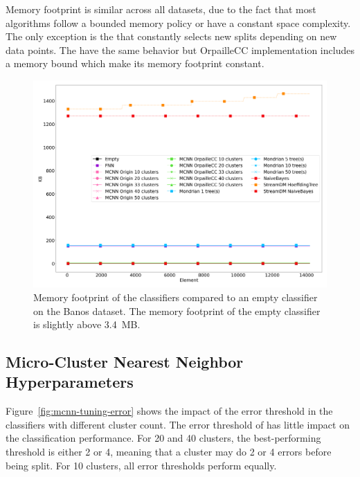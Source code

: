 Memory footprint is similar across all datasets, due to the fact that most
algorithms follow a bounded memory policy or have a constant space complexity.
The only exception is the \hoeffdingtree that constantly selects new splits
depending on new data points. The \mondrianforest have the same behavior but
OrpailleCC implementation includes a memory bound which make its memory
footprint constant.

\begin{figure}
	\includegraphics[width=\linewidth]{figures/results/banos_3_memory.png}
	\caption{Memory footprint of the classifiers compared to an empty
	classifier on the Banos dataset. The memory footprint of the empty
	classifier is slightly above 3.4~MB.}
	\label{fig:memory}
\end{figure}


\subsection{Micro-Cluster Nearest Neighbor Hyperparameters}

Figure~\ref{fig:mcnn-tuning-error} shows the impact of the error threshold
in the \mcnn classifiers with different cluster count. The error
threshold of \mcnn has little impact on the classification performance. For
20 and 40 clusters, the best-performing threshold is either 2 or 4, meaning
that a cluster may do 2 or 4 errors before being split. For 10 clusters,
all error thresholds perform equally.

